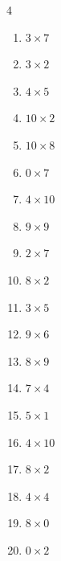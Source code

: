 \begin{multicols}{4}
\begin{enumerate}
  \item $3\times 7$
        \phantom{$=21$}

  \item $3\times 2$
        \phantom{$=6$}

  \item $4\times 5$
        \phantom{$=20$}

  \item $10\times 2$
        \phantom{$=20$}

  \item $10\times 8$
        \phantom{$=80$}

  \item $0\times 7$
        \phantom{$=0$}

  \item $4\times 10$
        \phantom{$=40$}

  \item $9\times 9$
        \phantom{$=81$}

  \item $2\times 7$
        \phantom{$=14$}

  \item $8\times 2$
        \phantom{$=16$}

  \item $3\times 5$
        \phantom{$=15$}

  \item $9\times 6$
        \phantom{$=54$}

  \item $8\times 9$
        \phantom{$=72$}

  \item $7\times 4$
        \phantom{$=28$}

  \item $5\times 1$
        \phantom{$=5$}

  \item $4\times 10$
        \phantom{$=40$}

  \item $8\times 2$
        \phantom{$=16$}

  \item $4\times 4$
        \phantom{$=16$}

  \item $8\times 0$
        \phantom{$=0$}

\columnbreak %

\resetques

  \item $0\times 2$
        \phantom{$=0$}


\end{enumerate}
\end{multicols}
